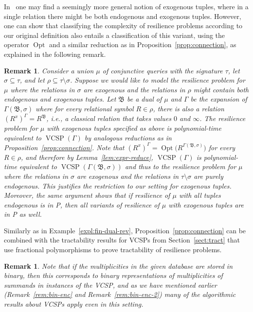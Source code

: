 \documentclass[nonacm]{acmart}
\newcommand{\bB}{{\mathfrak B}}
\DeclareMathOperator{\VCSP}{VCSP}
\DeclareMathOperator{\Opt}{Opt}
\newtheorem{remark}[theorem]{Remark}
\begin{document}
In~\cite{LatestResilience} one may find a seemingly more general notion of exogenous tuples, where in a single relation there might be both endogenous and exogenous tuples. However, one can show that classifying the complexity of resilience problems according to our original definition also entails a classification of this variant, using the operator $\Opt$ and a similar reduction as in Proposition~\ref{prop:connection}, as explained in the following remark.

\begin{remark} \label{rem:exo}
Consider a union $\mu$ of conjunctive queries with the signature $\tau$, let $\sigma \subseteq \tau$,  and let $\rho \subseteq \tau \setminus \sigma$. Suppose we would like to model the resilience problem for $\mu$ where the relations in $\sigma$ are exogenous and the relations in $\rho$ might contain both endogenous and exogenous tuples. Let $\bB$ be a dual of $\mu$ and $\Gamma$ be the expansion of $\Gamma(\bB, \sigma)$ where for every relational symbol $R \in \rho$, there is also a relation $(R^{x})^{\Gamma}=R^{\bB}$, i.e., a classical relation that takes values $0$ and $\infty$. The resilience problem for $\mu$ with exogenous tuples specified as above is polynomial-time equivalent to $\VCSP(\Gamma)$ by analogous reductions as in Proposition~\ref{prop:connection}.
Note that  $(R^{x})^{\Gamma}=\Opt\big (R^{\Gamma(\bB, \sigma)} \big)$ for every $R \in \rho$, and therefore by Lemma~\ref{lem:expr-reduce}, $\VCSP(\Gamma)$ is polynomial-time equivalent to $\VCSP(\Gamma(\bB,\sigma))$ and thus to the resilience problem for $\mu$ where the relations in $\sigma$ are exogenous and the relations in $\tau \setminus \sigma$ are purely endogenous. This justifies the restriction to our setting for exogenous tuples. Moreover, the same argument shows that if resilience of $\mu$ with all tuples endogenous is in P, then all variants of resilience of $\mu$ with exogenous tuples are in P as well.
\end{remark}


Similarly as in Example~\ref{expl:fin-dual-rev}, Proposition~\ref{prop:connection} can be combined with the tractability results for VCSPs from Section~\ref{sect:tract} that use fractional polymorphisms to prove tractability of resilience problems.
\begin{remark}\label{rem:bin-enc-3}
Note that if the multiplicities in the given database are stored in binary, then this corresponds to binary representations of multiplicities of summands in instances of the VCSP, and as we have mentioned earlier (Remark~\ref{rem:bin-enc} and Remark~\ref{rem:bin-enc-2}) many of the algorithmic results about VCSPs apply even in this setting.
\end{remark}
\end{document}
